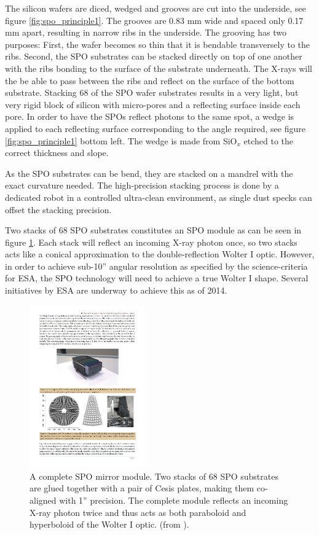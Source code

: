 The silicon wafers are diced, wedged and grooves are cut into the underside, see figure \ref{fig:spo_principle1}. The grooves are 0.83 mm wide and spaced only 0.17 mm apart, resulting in narrow ribs in the underside. The grooving has two purposes: First, the wafer becomes so thin that it is bendable transversely to the ribs. Second, the SPO substrates can be stacked directly on top of one another with the ribs bonding to the surface of the substrate underneath. The X-rays will the be able to pass between the ribs and reflect on the surface of the bottom substrate. Stacking 68 of the SPO wafer substrates results in a very light, but very rigid block of silicon with micro-pores and a reflecting surface inside each pore. In order to have the SPOs reflect photons to the same spot, a wedge is applied to each reflecting surface corresponding to the angle required, see figure \ref{fig:spo_principle1} bottom left. The wedge is made from SiO$_x$ etched to the correct thickness and slope.

As the SPO substrates can be bend, they are stacked on a mandrel with the exact curvature needed. The high-precision stacking process is done by a dedicated robot in a controlled ultra-clean environment, as single dust specks can offset the stacking precision.

Two stacks of 68 SPO substrates constitutes an SPO module as can be seen in figure \ref{fig:spo_stack}. Each stack will reflect an incoming X-ray photon once, so two stacks acts like a conical approximation to the double-reflection Wolter I optic. However, in order to achieve sub-10'' angular resolution as specified by the science-criteria for ESA, the SPO technology will need to achieve a true Wolter I shape. Several initiatives by ESA are underway to achieve this as of 2014.

\begin{figure}[!h]
  \center
  \includegraphics[height=7cm]{figures/athena/spo_stack.pdf}
\caption{\footnotesize A complete SPO mirror module. Two stacks of 68 SPO substrates are glued together with a pair of Cesis plates, making them co-aligned with 1'' precision. The complete module reflects an incoming X-ray photon twice and thus acts as both paraboloid and hyperboloid of the Wolter I optic. (from \cite{Willingale:2013vo}).}\label{fig:spo_stack}
\end{figure}

